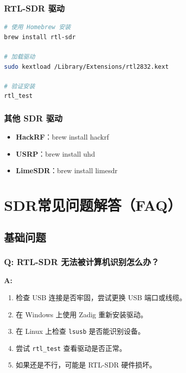 \documentclass[12pt,UTF8]{ctexbook}
\begin{document}
\subsection{RTL-SDR 驱动}
\begin{lstlisting}[language=Bash,caption={macOS 安装 RTL-SDR 驱动}]
# 使用 Homebrew 安装
brew install rtl-sdr

# 加载驱动
sudo kextload /Library/Extensions/rtl2832.kext

# 验证安装
rtl_test
\end{lstlisting}

\subsection{其他 SDR 驱动}
\begin{itemize}[leftmargin=2cm]
    \item \textbf{HackRF}：brew install hackrf
    \item \textbf{USRP}：brew install uhd
    \item \textbf{LimeSDR}：brew install limesdr
\end{itemize}

\chapter{SDR常见问题解答（FAQ）}
\label{app:sdr_faq}

\section{基础问题}
\label{sec:faq_basic}

\subsection{Q: RTL-SDR 无法被计算机识别怎么办？}
\textbf{A:}
\begin{enumerate}[leftmargin=2cm]
    \item 检查 USB 连接是否牢固，尝试更换 USB 端口或线缆。
    \item 在 Windows 上使用 Zadig 重新安装驱动。
    \item 在 Linux 上检查 \texttt{lsusb} 是否能识别设备。
    \item 尝试 \texttt{rtl\_test} 查看驱动是否正常。
    \item 如果还是不行，可能是 RTL-SDR 硬件损坏。
\end{enumerate}
\end{document}
